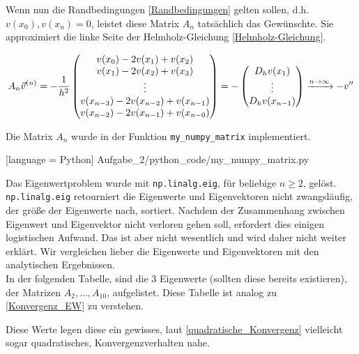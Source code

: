 Wenn nun die Randbedingungen \eqref{Randbedingungen} gelten sollen, d.h. $v(x_0), v(x_n) = 0$, leistet diese Matrix $A_n$ tatsächlich das Gewünschte. Sie approximiert die linke Seite der Helmholz-Gleichung \eqref{Helmholz-Gleichung}.

\begin{align*}
  A_n \vec v^{(n)} =
  -\frac{1}{h^2}
  \begin{pmatrix}
    v(x_0) - 2 v(x_1) + v(x_2)             \\
    v(x_1) - 2 v(x_2) + v(x_3)             \\
    \vdots                                 \\
    v(x_{n-3}) - 2 v(x_{n-2}) + v(x_{n-1}) \\
    v(x_{n-2}) - 2 v(x_{n-1}) + v(x_{n-0})
  \end{pmatrix} =
  -\begin{pmatrix}
    D_h v(x_1) \\
    \vdots     \\
    D_h v(x_{n-1})
  \end{pmatrix}
  \xrightarrow{n \to \infty}
  -v^{\prime \prime}
\end{align*}

Die Matrix $A_n$ wurde in der Funktion \verb|my_numpy_matrix| implementiert.


[language = Python]
{Aufgabe_2/python_code/my_numpy_matrix.py}

Das Eigenwertproblem wurde mit \verb|np.linalg.eig|, für beliebige $n \geq 2$, gelöst. \verb|np.linalg.eig| retourniert die Eigenwerte und Eigenvektoren nicht zwangsläufig, der größe der Eigenwerte nach, sortiert. Nachdem der Zusammenhang zwischen Eigenwert und Eigenvektor nicht verloren gehen soll, erfordert dies einigen logistischen Aufwand. Das ist aber nicht wesentlich und wird daher nicht weiter erklärt. Wir vergleichen lieber die Eigenwerte und Eigenvektoren mit den analytischen Ergebnissen. \\

In der folgenden Tabelle, sind die $3$ Eigenwerte (sollten diese bereits existieren), der Matrizen $A_2, \ldots, A_{10}$, aufgelistet. Diese Tabelle ist analog zu \eqref{Konvergenz_EW} zu verstehen. \\


\vspace{10pt}

Diese Werte legen diese ein gewisses, laut \eqref{quadratische_Konvergenz} vielleicht sogar quadratisches, Konvergenzverhalten nahe.

